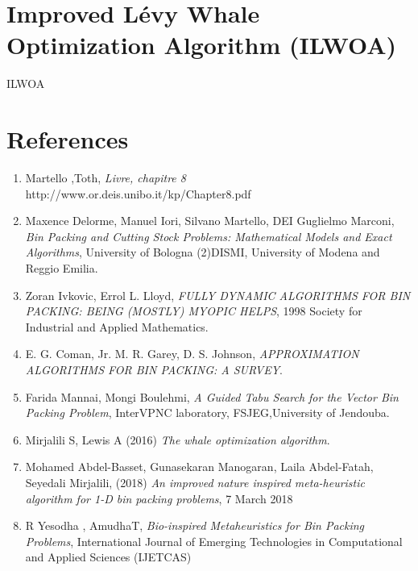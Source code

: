 \documentclass[12pt,a4paper, titlepage]{report}
\begin{document}
    \chapter{Improved Lévy Whale Optimization Algorithm (ILWOA)}
    {ILWOA}
    \chapter*{References}
      
    \begin{enumerate}
        \item Martello ,Toth, \emph{Livre, chapitre 8} \\http://www.or.deis.unibo.it/kp/Chapter8.pdf
        \item Maxence Delorme, Manuel Iori, Silvano Martello, DEI Guglielmo Marconi, \emph{Bin Packing and Cutting Stock Problems: Mathematical Models and Exact Algorithms}, University of Bologna (2)DISMI, University of Modena and Reggio Emilia.
        \item Zoran Ivkovic, Errol L. Lloyd, \emph{FULLY DYNAMIC ALGORITHMS FOR BIN PACKING: BEING (MOSTLY) MYOPIC HELPS}, 1998 Society for Industrial and Applied Mathematics.
        \item E. G. Coman, Jr. M. R. Garey, D. S. Johnson, \emph{APPROXIMATION ALGORITHMS FOR BIN PACKING: A SURVEY}.
        \item Farida Mannai, Mongi Boulehmi, \emph{A Guided Tabu Search for the Vector Bin Packing Problem}, InterVPNC laboratory, FSJEG,University of Jendouba.  
        \item Mirjalili S, Lewis A (2016) \emph{The whale optimization algorithm}.
        \item Mohamed Abdel-Basset, Gunasekaran Manogaran, Laila Abdel-Fatah, Seyedali Mirjalili, (2018) \emph{An improved nature inspired meta-heuristic algorithm for 1-D bin packing problems}, 7 March 2018
        \item R Yesodha , AmudhaT, \emph{Bio-inspired Metaheuristics for Bin Packing Problems}, International Journal of Emerging Technologies in Computational and Applied Sciences (IJETCAS)
    \end{enumerate}    
\end{document}
